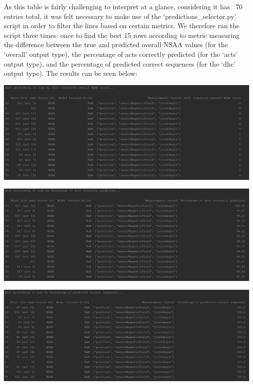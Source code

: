 \documentclass[12pt,twoside]{report}
\begin{document}
\quad As this table is fairly challenging to interpret at a glance, considering it has ~70 entries total, it was felt necessary to make use of the ‘predictions\_selector.py’ script in order to filter the lines based on certain metrics. We therefore ran the script three times: once to find the best 15 rows according to metric measuring the difference between the true and predicted overall NSAA values (for the ‘overall’ output type), the percentage of acts correctly predicted (for the ‘acts’ output type), and the percentage of predicted correct sequences (for the ‘dhc’ output type). The results can be seen below:

\begin{center}
\includegraphics[scale=0.2]{project_figures/fig11_11}
\end{center}

\begin{center}
\includegraphics[scale=0.2]{project_figures/fig11_12}
\end{center}

\begin{center}
\includegraphics[scale=0.2]{project_figures/fig11_13}
\end{center}
\end{document}
